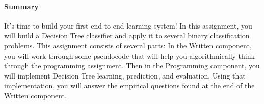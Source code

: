 \vspace*{-6mm}
\begin{notebox}
\paragraph{Summary} It's time to build your first end-to-end learning system! In this assignment, you will build a Decision Tree classifier and apply it to several binary classification problems. This assignment consists of several parts: In the Written component, you will work through some pseudocode that will help you algorithmically think through the programming assignment. Then in the Programming component, you will implement Decision Tree learning, prediction, and evaluation. Using that implementation, you will answer the empirical questions found at the end of the Written component.
\end{notebox}
\vspace*{-5mm}